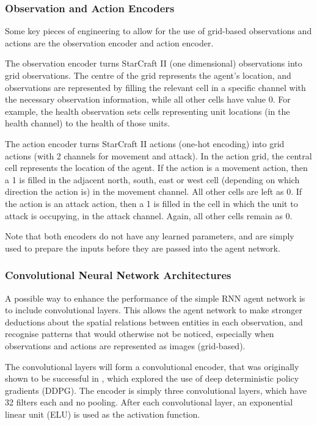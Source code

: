 \subsubsection{Observation and Action Encoders}

Some key pieces of engineering to allow for the use of grid-based observations and actions are the observation encoder and action encoder. 

The observation encoder turns StarCraft II (one dimensional) observations into grid observations. The centre of the grid represents the agent's location, and observations are represented by filling the relevant cell in a specific channel with the necessary observation information, while all other cells have value 0. For example, the health observation sets cells representing unit locations (in the health channel) to the health of those units. 

The action encoder turns StarCraft II actions (one-hot encoding) into grid actions (with 2 channels for movement and attack). In the action grid, the central cell represents the location of the agent. If the action is a movement action, then a 1 is filled in the adjacent north, south, east or west cell (depending on which direction the action is) in the movement channel. All other cells are left as 0. If the action is an attack action, then a 1 is filled in the cell in which the unit to attack is occupying, in the attack channel. Again, all other cells remain as 0. 



Note that both encoders do not have any learned parameters, and are simply used to prepare the inputs before they are passed into the agent network.

\subsubsection{Convolutional Neural Network Architectures}

A possible way to enhance the performance of the simple RNN agent network is to include convolutional layers. This allows the agent network to make stronger deductions about the spatial relations between entities in each observation, and recognise patterns that would otherwise not be noticed, especially when observations and actions are represented as images (grid-based). 

The convolutional layers will form a convolutional encoder, that was originally shown to be successful in \cite{ddpg}, which explored the use of deep deterministic policy gradients (DDPG). The encoder is simply three convolutional layers, which have 32 filters each and no pooling. After each convolutional layer, an exponential linear unit (ELU) is used as the activation function.

